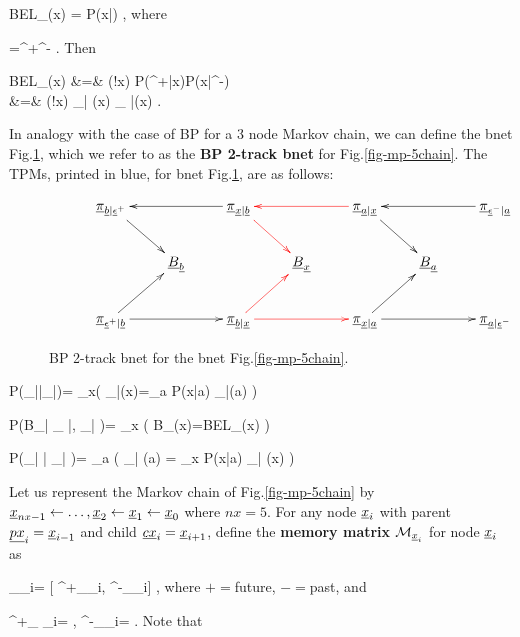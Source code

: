 \beq
BEL_\rvx(x)
=
P(x|\eps)
\;,
\eeq
where

\beq
\rveps=\rveps^+\cup\rveps^-
\;.
\eeq
Then


\beqa
BEL_\rvx(x)
&=&
\caln(!x)
P(\eps^+|x)P(x|\eps^-)
\\
&=&
\caln(!x)
\pi_{\rvb| \rvx}(x)
\pi_{ \rvx|\rvb}(x)
\;.
\eeqa

In analogy
with the case of BP for a 3 node Markov
chain, we can define the bnet
Fig.\ref{fig-BEL-4pi},
which we refer to as the
{\bf BP
2-track bnet} for Fig.\ref{fig-mp-5chain}.
The TPMs, printed in blue,
 for bnet Fig.\ref{fig-BEL-4pi}, are
as follows:





\begin{figure}[h!]
$$\xymatrix{
&\ul{\pi}_{\rvb|\rveps^+}\ar[dr]
&&\ul{\pi}_{\rvx|\rvb}\ar[ll]\ar@[red][dr]
&&\ul{\pi}_{\rva|\rvx}\ar@[red][ll]\ar[dr]
&&\ul{\pi}_{\rveps^-|\rva}\ar[ll]
\\
&&\rvB_\rvb
&&\rvB_\rvx
&&\rvB_\rva
\\
&\ul{\pi}_{\rveps^+|\rvb}\ar[rr]\ar[ur]
&&\ul{\pi}_{\rvb|\rvx}\ar@[red][rr]\ar@[red][ur]
&&\ul{\pi}_{\rvx|\rva}\ar[rr]\ar[ur]
&&\ul{\pi}_{\rva|\rveps^-}
}$$
\caption{BP 2-track bnet for the bnet
Fig.\ref{fig-mp-5chain}.}
\label{fig-BEL-4pi}
\end{figure}


\beq\color{blue}
P(\pi_{\rvx|\rvb}|\pi_{\rva|\rvx})=
\prod_{x}\indi\left(
\pi_{\rvx|\rvb}(x)=\sum_a P(x|a)
\pi_{\rva|\rvx}(a)
\right)
\label{eq-pr-pi-bar-pi}
\eeq

\beq\color{blue}
P(B_\rvx|
\pi_{ \rvx|\rvb},
\pi_{\rvb| \rvx})=
\prod_x
\indi\left(
B_\rvx(x)=BEL_\rvx(x)
\right)
\eeq

\beq\color{blue}
P(\pi_{\rvx| \rva}|
\pi_{\rvb| \rvx})=
\prod_{a}
\indi\left(
\pi_{\rvx| \rva}(a)
=
\sum_x P(x|a)
\pi_{\rvb| \rvx}(x)
\right)
\label{eq-pr-lam-bar-lam}
\eeq

Let us represent the Markov
chain of Fig.\ref{fig-mp-5chain}
by
${\underline{x}}_{nx-1}
\leftarrow \ldots, {\underline{x}}_2\leftarrow {\underline{x}}_1\leftarrow {\underline{x}}_0$
where $nx=5$.
For any node
${\underline{x}}_i$
with
parent $\underline{px}_i={\underline{x}}_{i-1}$
and child $\underline{cx}_i={\underline{x}}_{i+1}$,
define
the {\bf memory matrix}
${\cal M}_{{\underline{x}}_i}$
for node ${\underline{x}}_i$
as

\beq
\calm_{\rvx_i}=
[
\calm^+_{\rvx_i},
\calm^-_{\rvx_i}]
\;,
\eeq
where $+=$future, $-=$past, and

\beq
\calm^+_{ \rvx_i}=
\;,
\;\;\;
\calm^-_{\rvx_i}=
\;.
\eeq
Note that

